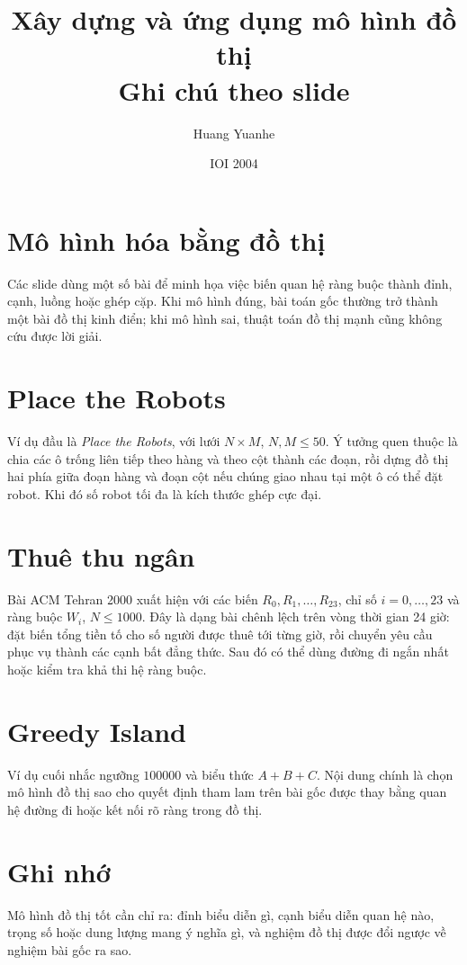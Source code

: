 \documentclass[11pt]{article}
\title{Xây dựng và ứng dụng mô hình đồ thị\\{\large Ghi chú theo slide}}
\author{Huang Yuanhe}
\date{IOI 2004}
\begin{document}
\maketitle


\section{Mô hình hóa bằng đồ thị}

Các slide dùng một số bài để minh họa việc biến quan hệ ràng buộc thành đỉnh,
cạnh, luồng hoặc ghép cặp. Khi mô hình đúng, bài toán gốc thường trở thành
một bài đồ thị kinh điển; khi mô hình sai, thuật toán đồ thị mạnh cũng không
cứu được lời giải.

\section{Place the Robots}

Ví dụ đầu là \emph{Place the Robots}, với lưới \(N\times M\),
\(N,M\le 50\). Ý tưởng quen thuộc là chia các ô trống liên tiếp theo hàng và
theo cột thành các đoạn, rồi dựng đồ thị hai phía giữa đoạn hàng và đoạn cột
nếu chúng giao nhau tại một ô có thể đặt robot. Khi đó số robot tối đa là
kích thước ghép cực đại.

\section{Thuê thu ngân}

Bài ACM Tehran 2000 xuất hiện với các biến \(R_0,R_1,\ldots,R_{23}\), chỉ số
\(i=0,\ldots,23\) và ràng buộc \(W_i\), \(N\le 1000\). Đây là dạng bài chênh
lệch trên vòng thời gian 24 giờ: đặt biến tổng tiền tố cho số người được thuê
tới từng giờ, rồi chuyển yêu cầu phục vụ thành các cạnh bất đẳng thức. Sau đó
có thể dùng đường đi ngắn nhất hoặc kiểm tra khả thi hệ ràng buộc.

\section{Greedy Island}

Ví dụ cuối nhắc ngưỡng \(100000\) và biểu thức \(A+B+C\). Nội dung chính là
chọn mô hình đồ thị sao cho quyết định tham lam trên bài gốc được thay bằng
quan hệ đường đi hoặc kết nối rõ ràng trong đồ thị.

\section{Ghi nhớ}

Mô hình đồ thị tốt cần chỉ ra: đỉnh biểu diễn gì, cạnh biểu diễn quan hệ nào,
trọng số hoặc dung lượng mang ý nghĩa gì, và nghiệm đồ thị được đổi ngược về
nghiệm bài gốc ra sao.
\end{document}
